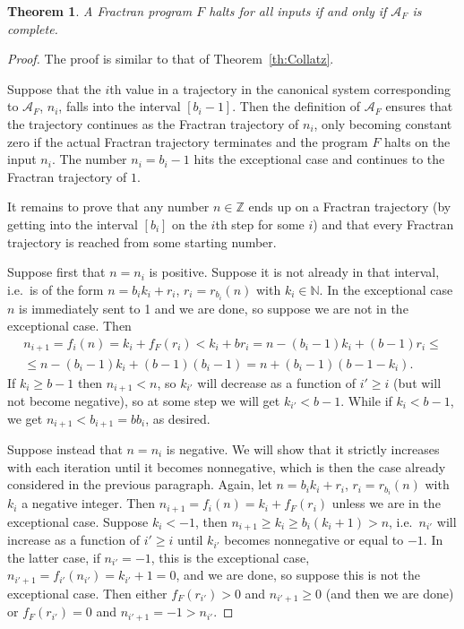 \documentclass[12pt]{article}
\newtheorem{theorem}{Theorem}
\theoremstyle{definition}
\newcommand{\N}{\mathbb{N}}
\newcommand{\Z}{\mathbb{Z}}
\begin{document}
\begin{theorem}
\label{thm:Fractran-type}
A Fractran program $F$ halts for all inputs if and only if $\mathcal{A}_F$ is complete.
\end{theorem}
\begin{proof}
The proof is similar to that of Theorem~\ref{th:Collatz}.

Suppose that the $i$th value in a trajectory in the canonical system corresponding to $\mathcal{A}_F$, $n_i$, falls into the interval $[b_i-1]$. Then the definition of $\mathcal{A}_F$ ensures that the trajectory continues as the Fractran trajectory of $n_i$, only becoming constant zero if the actual Fractran trajectory terminates and the program $F$ halts on the input $n_i$. The number $n_i=b_i-1$ hits the exceptional case and continues to the Fractran trajectory of $1$.

It remains to prove that any number $n\in\Z$ ends up on a Fractran trajectory (by getting into the interval $[b_i]$ on the $i$th step for some $i$) and that every Fractran trajectory is reached from some starting number.

Suppose first that $n=n_i$ is positive. Suppose it is not already in that interval, i.e.\ is of the form $n=b_i k_i + r_i$, $r_i= r_{b_i}(n)$ with $k_i\in\N$. In the exceptional case $n$ is immediately sent to 1 and we are done, so suppose we are not in the exceptional case. Then
\begin{multline*}
n_{i+1} = f_i(n) = k_i + f_F(r_i) < k_i + br_i = n - (b_i-1)k_i + (b-1)r_i\leqslant \\ \leqslant n - (b_i-1)k_i + (b-1)(b_i-1) = n + (b_i-1)(b-1-k_i).
\end{multline*}
If $k_i\geqslant b-1$ then $n_{i+1}<n$, so $k_{i'}$ will decrease as a function of $i'\geqslant i$ (but will not become negative), so at some step we will get $k_{i'}<b-1$. While if $k_i<b-1$, we get $n_{i+1}<b_{i+1}=bb_i$, as desired.

Suppose instead that $n=n_i$ is negative. We will show that it strictly increases with each iteration until it becomes nonnegative, which is then the case already considered in the previous paragraph. Again, let $n = b_ik_i+r_i$, $r_i= r_{b_i}(n)$ with $k_i$ a negative integer. Then $n_{i+1} = f_i(n) = k_i + f_F(r_i)$ unless we are in the exceptional case. Suppose $k_i<-1$, then $n_{i+1}\geqslant k_i \geqslant b_i(k_i+1) > n$, i.e.\ $n_{i'}$ will increase as a function of $i'\geqslant i$ until $k_{i'}$ becomes nonnegative or equal to $-1$. In the latter case, if $n_{i'}=-1$, this is the exceptional case, $n_{i'+1} = f_{i'}(n_{i'}) = k_{i'} + 1 = 0$, and we are done, so suppose this is not the exceptional case. Then either $f_F(r_{i'})>0$ and $n_{i'+1}\geqslant0$ (and then we are done) or $f_F(r_{i'})=0$ and $n_{i'+1}=-1>n_{i'}$.


\end{proof}
\end{document}
